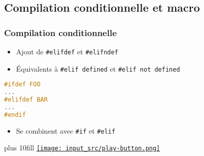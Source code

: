 \documentclass[C++.tex]{subfiles}
\begin{document}
\subsection*{Compilation conditionnelle et macro}
\begin{frame}[fragile]
	\frametitle{Compilation conditionnelle}
	\begin{itemize}
		\item Ajout de \lstinline|#elifdef| et \lstinline|#elifndef|
		\item Équivalents à \lstinline|#elif defined| et \lstinline|#elif not defined|
	\end{itemize}

	\begin{lstlisting}[language=C++]
#ifdef FOO
...
#elifdef BAR
...
#endif\end{lstlisting}

	\begin{itemize}
		\item Se combinent avec \lstinline|#if| et \lstinline|#elif|
	\end{itemize}

	\vskip 10mm plus 10fill
	\hfill
	\href{https://godbolt.org/#g:!((g:!((g:!((h:codeEditor,i:(filename:'1',fontScale:14,fontUsePx:'0',j:1,lang:c%2B%2B,selection:(endColumn:3,endLineNumber:13,positionColumn:3,positionLineNumber:13,selectionStartColumn:3,selectionStartLineNumber:13,startColumn:3,startLineNumber:13),source:'%23include+%3Ciostream%3E%0A+%0A//%23define+FOO%0A//%23define+BAR%0A%0Aint+main()%0A%7B%0A%23ifdef+FOO%0A++std::cout+%3C%3C+%22FOO%5Cn%22%3B%0A%23elifdef+BAR%0A++std::cout+%3C%3C+%22BAR%5Cn%22%3B%0A%23else%0A++std::cout+%3C%3C+%22Autre%5Cn%22%3B%0A%23endif%0A%7D%0A'),l:'5',n:'0',o:'C%2B%2B+source+%231',t:'0')),k:50,l:'4',n:'0',o:'',s:0,t:'0'),(g:!((h:executor,i:(argsPanelShown:'1',compilationPanelShown:'0',compiler:g122,compilerName:'',compilerOutShown:'0',execArgs:'',execStdin:'',fontScale:14,fontUsePx:'0',j:1,lang:c%2B%2B,libs:!((name:boost,ver:'175')),options:'-std%3Dc%2B%2B23+-Wall+-Wextra+-pedantic',source:1,stdinPanelShown:'1',tree:'1',wrap:'0'),l:'5',n:'0',o:'Executor+x86-64+gcc+12.2+(C%2B%2B,+Editor+%231)',t:'0')),header:(),k:50,l:'4',n:'0',o:'',s:0,t:'0')),l:'2',n:'0',o:'',t:'0')),version:4}{\texttt{[image: input\_src/play-button.png]}}
\end{frame}
\end{document}
